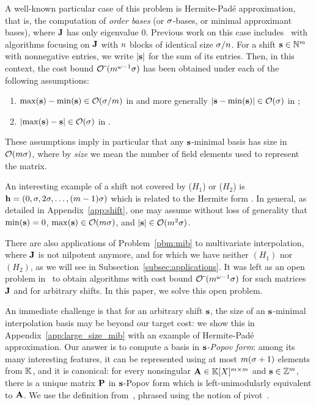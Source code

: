 \documentclass[preprint]{sig-alternate-05-2015}
\begin{document}
A well-known particular case of this problem is Hermite-Pad\'e approximation,
that is, the computation of \emph{order bases} (or $\order$-bases, or minimal
approximant bases), where $\mulmat$ has only eigenvalue $0$. Previous work on
this case includes~\cite{BecLab94,GiJeVi03,Storjohann06,ZhoLab12} with
algorithms focusing on $\mulmat$ with $\cdim$ blocks of identical size
$\order/\cdim$. For a shift $\shifts \in \NN^\rdim$ with nonnegative entries,
we write $\sshifts$ for the sum of its entries. Then, in this context, the cost
bound $\softO{ \rdim^{\expmatmul-1} \order}$ has been obtained under each of
the following assumptions:
\begin{enumerate}[($H_1$)]
  \item $\max(\shifts) - \min(\shifts) \in \bigO{\order/\rdim}$ in
\cite[Theorem~5.3]{ZhoLab12} and more generally
$\sshifts[\shifts-\min(\shifts)] \in \bigO{\order}$ in
\cite[Section~4.1]{Zhou12};
  \item $\sshifts[\!\max(\shifts)-\shifts] \in \bigO{\order}$ in
\cite[Theorem~6.14]{ZhoLab12}.
\end{enumerate}
These assumptions imply in particular that any $\shifts$-minimal basis has size
in $\bigO{\rdim \order}$, where by \emph{size} we mean the number of field
elements used to represent the matrix.

An interesting example of a shift not covered by ($H_1$) or ($H_2$) is
$\shifts[h] = (0,\order,2\order,\ldots,(\rdim-1)\order)$ which is related to
the Hermite form \cite[Lemma~2.6]{BeLaVi06}. In general, as detailed in
Appendix~\ref{app:shift}, one may assume without loss of generality that
$\min(\shifts) = 0$, $\max(\shifts) \in \bigO{\rdim \order}$, and $\sshifts \in
\bigO{\rdim^2 \order}$. 

There are also applications of Problem~\ref{pbm:mib} to multivariate
interpolation, where $\mulmat$ is not nilpotent anymore, and for which we have
neither $(H_1)$ nor $(H_2)$, as we will see in
Subsection~\ref{subsec:applications}. It was left
as an open problem in~\cite[Section~7]{ZhoLab12} to obtain algorithms with cost
bound $\softO{\rdim^{\expmatmul-1} \order}$ for such matrices $\mulmat$ and for
arbitrary shifts. In this paper, we solve this open problem.

An immediate challenge is that for an arbitrary shift $\shifts$, the size of an
$\shifts$-minimal interpolation basis may be beyond our target cost: we show
this in Appendix~\ref{app:large_size_mib} with an example of Hermite-Pad\'e
approximation. Our answer is to compute a basis in \emph{$\shifts$-Popov form}:
among its many interesting features, it can be represented using at most $\rdim
(\order+1)$ elements from $\field$, and it is canonical: for every nonsingular
$\mat{A} \in \polMatSpace[\rdim]$ and $\shifts \in \shiftSpace$, there is a
unique matrix $\mat{P}$ in $\shifts$-Popov form which is left-unimodularly
equivalent to $\mat{A}$. We use the definition from~\cite[Section~7]{BecLab00},
phrased using the notion of pivot~\cite[Section~6.7.2]{Kailath80}.
\end{document}
